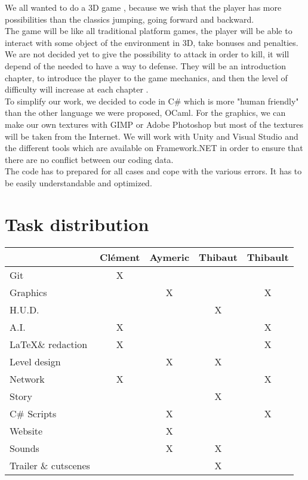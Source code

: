 \documentclass[twoside,12pt]{report}	%
\newcommand{\cg}{\cellcolor{gray!50}}%
\newcommand{\cc}{\cellcolor{cyan!50}}%
\begin{document}
		We all wanted to do a 3D game , because we wish that the player has more possibilities than the classics jumping, going forward and backward.
		\\
		The game will be like all traditional platform games, the player will be able to interact with some object of the environment in 3D, take bonuses and penalties.
		We are not decided yet to give the possibility to attack in order to kill, it will depend of the needed to have a way to defense.%
		They will be an introduction chapter, to introduce the player to the game mechanics, and then the level of difficulty will increase at each chapter .
		\\
		To simplify our work, we decided to code in C\# which is more "human friendly" than the other language we were proposed, OCaml.
		For the graphics, we can make our own textures with GIMP or Adobe Photoshop but most of the textures will be taken from the Internet.
		We will work with Unity and Visual Studio and the different tools which are available on Framework.NET in order to ensure that there are no conflict between our coding data.%
		\\
		The code has to prepared for all cases and cope with the various errors. It has to be easily understandable and optimized.

		\def\arraystretch{1.5}

		\section{Task distribution}
			\begin{tabular}{|l|c|c|c|c|}
				\cline{2-5} \multicolumn{1}{c|}{}	 & \cg Clément	 & \cg Aymeric	 & \cg Thibaut	 & \cg Thibault	\\
				\hline Git							 & \cc X		 & 				 & 				 & 					\\
				\hline Graphics						 & 				 & \cc X		 & 				 & \cc X			\\
				\hline H.U.D.						 & 				 & 				 & \cc X		 & 					\\
				\hline A.I.							 & \cc X		 & 				 & 				 & \cc X			\\
				\hline \LaTeX \& redaction			 & \cc X		 & 				 & 				 & \cc X			\\
				\hline Level design					 & 				 & \cc X		 & \cc X		 & 					\\
				\hline Network						 & \cc X		 & 				 & 				 & \cc X			\\
				\hline Story						 & 				 & 				 & \cc X		 & 					\\
				\hline C\# Scripts					 & 				 & \cc X		 & 				 & \cc X			\\
				\hline Website						 & 				 & \cc X		 & 				 & 					\\
				\hline Sounds						 & 				 & \cc X		 & \cc X		 & 					\\
				\hline Trailer \& cutscenes			 & 				 & 				 & \cc X		 &					\\
				\hline
			\end{tabular}
\end{document}
